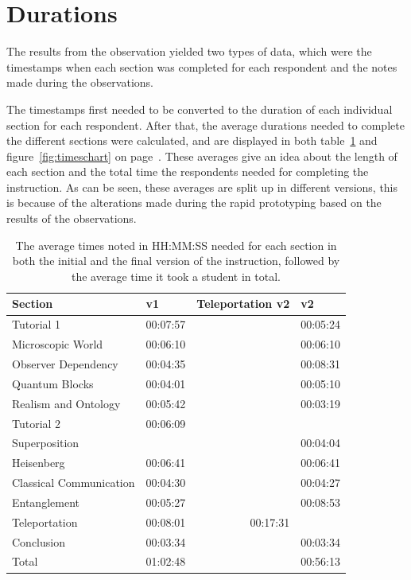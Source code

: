 \documentclass[11pt,twoside]{report} %
\begin{document}
\section{Durations}

The results from the observation yielded two types of data, which were the timestamps when each section was completed for each respondent and the notes made during the observations.

The timestamps first needed to be converted to the duration of each individual section for each respondent. After that, the average durations needed to complete the different sections were calculated, and are displayed in both table~\ref{tab:timetable} and figure~\ref{fig:timeschart} on page~\pageref{fig:timeschart}. These averages give an idea about the length of each section and the total time the respondents needed for completing the instruction. As can be seen, these averages are split up in different versions, this is because of the alterations made during the rapid prototyping based on the results of the observations.

\begin{table}[htbp]
\begin{center}
\begin{tabular}{|l|r|l|r|}
\hline
Section & \multicolumn{1}{l|}{v1} & Teleportation v2 & \multicolumn{1}{l|}{v2} \\ \hline
Tutorial 1 & 00:07:57 &  & 00:05:24 \\ \hline
Microscopic World & 00:06:10 &  & 00:06:10 \\ \hline
Observer Dependency & 00:04:35 &  & 00:08:31 \\ \hline
Quantum Blocks & 00:04:01 &  & 00:05:10 \\ \hline
Realism and Ontology & 00:05:42 &  & 00:03:19 \\ \hline
Tutorial 2 & 00:06:09 &  & \multicolumn{1}{l|}{} \\ \hline
Superposition & \multicolumn{1}{l|}{} &  & 00:04:04 \\ \hline
Heisenberg & 00:06:41 &  & 00:06:41 \\ \hline
Classical Communication & 00:04:30 &  & 00:04:27 \\ \hline
Entanglement & 00:05:27 &  & 00:08:53 \\ \hline
Teleportation & 00:08:01 & \multicolumn{1}{r|}{00:17:31} & \multicolumn{1}{l|}{} \\ \hline
Conclusion & 00:03:34 &  & 00:03:34 \\ \hline
Total & 01:02:48 &  & 00:56:13 \\ \hline
\end{tabular}
\caption{The average times noted in HH:MM:SS needed for each section in both the initial and the final version of the instruction, followed by the average time it took a student in total.\label{tab:timetable}}
\end{center}
\end{table}
\end{document}
